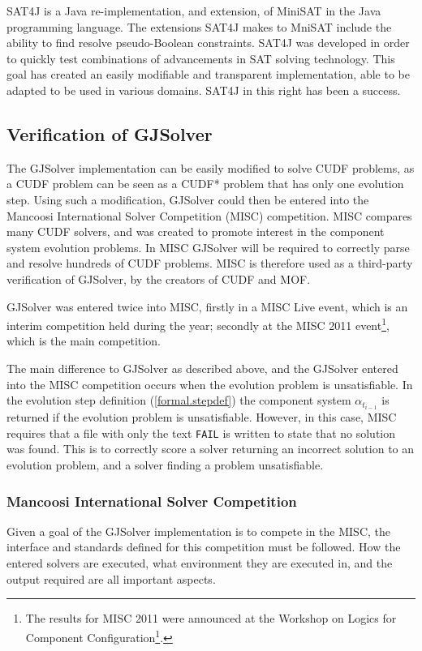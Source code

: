 SAT4J \citep{le2010sat4j} is a Java re-implementation, and extension, of MiniSAT in the Java programming language.
The extensions SAT4J makes to MniSAT include the ability to find resolve pseudo-Boolean constraints.
SAT4J was developed in order to quickly test combinations of advancements in SAT solving technology.
This goal has created an easily modifiable and transparent implementation, able to be adapted to be used in various domains.
SAT4J in this right has been a success.

\subsection{Verification of GJSolver}
\label{impl.verif}
The GJSolver implementation can be easily modified to solve CUDF problems, as a CUDF problem can be seen as a CUDF* problem that has only one evolution step.
Using such a modification, GJSolver could then be entered into the Mancoosi International Solver Competition (MISC) competition.
MISC compares many CUDF solvers, and was created to promote interest in the component system evolution problems.
In MISC GJSolver will be required to correctly parse and resolve hundreds of CUDF problems.
MISC is therefore used as a third-party verification of GJSolver, by the creators of CUDF and MOF.

GJSolver was entered twice into MISC, firstly in a MISC Live event, which is an interim competition held during the year;
secondly at the MISC 2011 event\footnote{The results for MISC 2011 were announced at the Workshop on Logics for Component Configuration\footnote{http://www.pps.jussieu.fr/~treinen/lococo/2011/ accessed 6/3/2012}.}, 
which is the main competition. 

The main difference to GJSolver as described above, and the GJSolver entered into the MISC competition occurs when the evolution problem is unsatisfiable.
In the evolution step definition (\ref{formal.stepdef}) the component system $\alpha_{t_{i-1}}$ is returned if the evolution problem is unsatisfiable.
However, in this case, MISC requires that a file with only the text \texttt{FAIL} is written to state that no solution was found.
This is to correctly score a solver returning an incorrect solution to an evolution problem, 
and a solver finding a problem unsatisfiable.

\subsubsection{Mancoosi International Solver Competition}
\label{impl.MISCDEF}
Given a goal of the GJSolver implementation is to compete in the MISC, the interface and standards defined for this competition must be followed.
How the entered solvers are executed, what environment they are executed in, and the output required are all important aspects.

